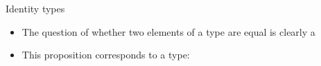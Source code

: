 \documentclass[11pt]{beamer}
\newcommand{\red}[1]{{\color{red}{#1}}}
\begin{document}
\begin{frame}{Identity types}
\vfill
\begin{itemize}

\vfill\item The question of whether two elements of a type are equal is
clearly a \red{proposition}

\vfill\item This proposition corresponds to a type:

\end{itemize}

\begin{code}\>\<%
\\
\>  \AgdaSymbol{\{} \AgdaSymbol{:} \AgdaSymbol{\}} \AgdaSymbol{:} \AgdaSymbol{(}  \AgdaSymbol{:} \AgdaSymbol{)}   \<%
\\
\>[0]\<[2]%
\>[2] \AgdaSymbol{:} \AgdaSymbol{(} \AgdaSymbol{:} \AgdaSymbol{)}  \AgdaSymbol{(}  \AgdaSymbol{)}\<%
\\
%
\\
\> \AgdaSymbol{:}   \<%
\\
\> \AgdaSymbol{=}  \<%
\\
%
\\
\> \AgdaSymbol{:} \AgdaSymbol{(} \AgdaPrimitive{+} \AgdaSymbol{)}  \AgdaSymbol{(} \AgdaPrimitive{*} \AgdaSymbol{)}\<%
\\
\> \AgdaSymbol{=}  \<%
\\
\>\<\end{code}


\end{frame}
\end{document}
